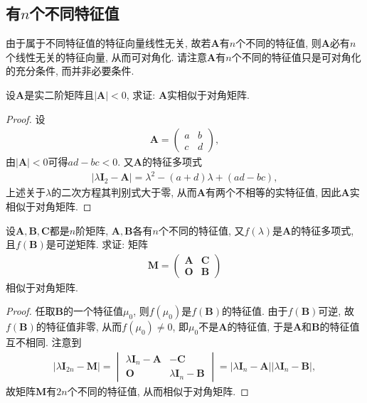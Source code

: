 \documentclass[../../main.tex]{subfiles}%
\begin{document}
\subsection{有$n$个不同特征值}

由于属于不同特征值的特征向量线性无关, 故若$\boldsymbol{A}$有$n$个不同的特征值, 则$\boldsymbol{A}$必有$n$个线性无关的特征向量, 从而可对角化. 请注意$\boldsymbol{A}$有$n$个不同的特征值只是可对角化的充分条件, 而并非必要条件. 

\begin{example}
设$\boldsymbol{A}$是实二阶矩阵且$|\boldsymbol{A}|< 0$, 求证: $\boldsymbol{A}$实相似于对角矩阵.
\end{example}
\begin{proof}
设
\begin{align*}
\boldsymbol{A}=\begin{pmatrix}
a&b\\
c&d
\end{pmatrix},
\end{align*}
由$|\boldsymbol{A}|< 0$可得$ad - bc< 0$. 又$\boldsymbol{A}$的特征多项式
\begin{align*}
|\lambda\boldsymbol{I}_2-\boldsymbol{A}|=\lambda^2-(a + d)\lambda+(ad - bc),
\end{align*}
上述关于$\lambda$的二次方程其判别式大于零, 从而$\boldsymbol{A}$有两个不相等的实特征值, 因此$\boldsymbol{A}$实相似于对角矩阵.
\end{proof}

\begin{example}
设$\boldsymbol{A},\boldsymbol{B},\boldsymbol{C}$都是$n$阶矩阵, $\boldsymbol{A},\boldsymbol{B}$各有$n$个不同的特征值, 又$f(\lambda)$是$\boldsymbol{A}$的特征多项式, 且$f(\boldsymbol{B})$是可逆矩阵. 求证: 矩阵
\begin{align*}
\boldsymbol{M}=\begin{pmatrix}
\boldsymbol{A}&\boldsymbol{C}\\
\boldsymbol{O}&\boldsymbol{B}
\end{pmatrix}
\end{align*}
相似于对角矩阵.
\end{example}
\begin{proof}
任取$\boldsymbol{B}$的一个特征值$\mu_0$, 则$f(\mu_0)$是$f(\boldsymbol{B})$的特征值. 由于$f(\boldsymbol{B})$可逆, 故$f(\boldsymbol{B})$的特征值非零, 从而$f(\mu_0)\neq 0$, 即$\mu_0$不是$\boldsymbol{A}$的特征值, 于是$\boldsymbol{A}$和$\boldsymbol{B}$的特征值互不相同. 注意到
\begin{align*}
|\lambda\boldsymbol{I}_{2n}-\boldsymbol{M}|=\begin{vmatrix}
\lambda\boldsymbol{I}_n-\boldsymbol{A}&-\boldsymbol{C}\\
\boldsymbol{O}&\lambda\boldsymbol{I}_n-\boldsymbol{B}
\end{vmatrix}=|\lambda\boldsymbol{I}_n-\boldsymbol{A}||\lambda\boldsymbol{I}_n-\boldsymbol{B}|,
\end{align*}
故矩阵$\boldsymbol{M}$有$2n$个不同的特征值, 从而相似于对角矩阵.
\end{proof}
\end{document}
